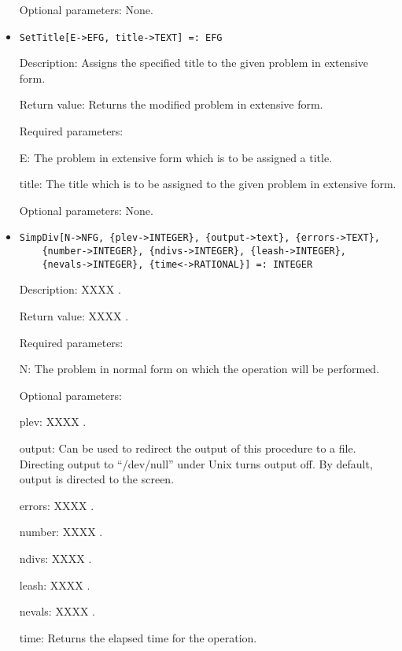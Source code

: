 \begin{itemize}
\item
[Optional parameters:] None.

\ed

\item

\protect \large \begin{verbatim}
SetTitle[E->EFG, title->TEXT] =: EFG
\end{verbatim}\normalsize

\bd
\item
[Description:] Assigns the specified title to the given problem in 
extensive form.
\item
[Return value:] Returns the modified problem in extensive form.
\item
[Required parameters:]\hfil\null
	
\bd
\item
[ E:] The problem in extensive form which is to be assigned a title.
\item
[ title:] The title which is to be assigned to the given problem in 
extensive form.
\ed

\item
[Optional parameters:] None.
\ed

\item
\protect \large \begin{verbatim}
SimpDiv[N->NFG, {plev->INTEGER}, {output->text}, {errors->TEXT},
	{number->INTEGER}, {ndivs->INTEGER}, {leash->INTEGER}, 
	{nevals->INTEGER}, {time<->RATIONAL}] =: INTEGER
\end{verbatim}\normalsize

\bd
\item
[Description:] XXXX .
\item
[Return value:] XXXX .
\item
[Required parameters:]\hfil\null

\bd
\item
[ N:] The problem in normal form on which the operation will be performed.
\ed

\item
[Optional parameters:]\hfil\null
	
\bd
\item
[ plev:]XXXX .
\item
[ output:] Can be used to redirect the output of this procedure to a
file.  Directing output to ``/dev/null'' under Unix turns 
output off.  By default, output is directed to the screen.
\item
[ errors:] XXXX .
\item
[ number:] XXXX .
\item 
[ ndivs:] XXXX .
\item
[ leash:] XXXX .
\item
[ nevals:] XXXX .
\item
[ time:] Returns the elapsed time for the operation.
\ed
\ed


\end{itemize}
